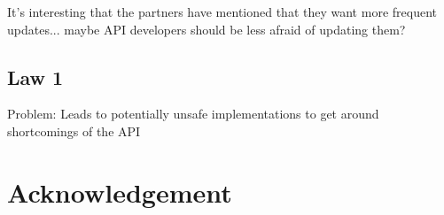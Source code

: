 \documentclass[conference]{IEEEtran}
\begin{document}
It's interesting that the partners have mentioned that they want more frequent updates... maybe API developers should be less afraid of updating them? 


\subsection{Law 1}

Problem: Leads to potentially unsafe implementations to get around shortcomings of the API

\section*{Acknowledgement} \label{acknowledgement}




\end{document}
